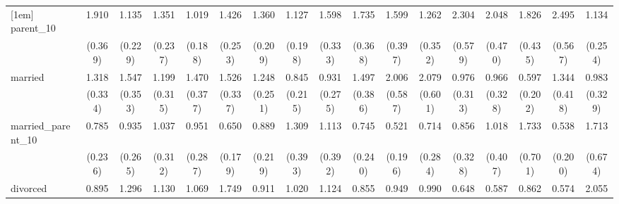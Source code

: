 {\begin{tabular}{l*{16}{c}}
[1em]
parent\_10           &       1.910\sym{***}&       1.135         &       1.351         &       1.019         &       1.426\sym{*}  &       1.360\sym{*}  &       1.127         &       1.598\sym{*}  &       1.735\sym{**} &       1.599         &       1.262         &       2.304\sym{***}&       2.048\sym{**} &       1.826\sym{*}  &       2.495\sym{***}&       1.134         \\
                    &     (0.369)         &     (0.229)         &     (0.237)         &     (0.188)         &     (0.253)         &     (0.209)         &     (0.198)         &     (0.333)         &     (0.368)         &     (0.397)         &     (0.352)         &     (0.579)         &     (0.470)         &     (0.435)         &     (0.567)         &     (0.254)         \\
[1em]
married             &       1.318         &       1.547         &       1.199         &       1.470         &       1.526         &       1.248         &       0.845         &       0.931         &       1.497         &       2.006\sym{*}  &       2.079\sym{*}  &       0.976         &       0.966         &       0.597         &       1.344         &       0.983         \\
                    &     (0.334)         &     (0.353)         &     (0.315)         &     (0.377)         &     (0.337)         &     (0.251)         &     (0.215)         &     (0.275)         &     (0.386)         &     (0.587)         &     (0.601)         &     (0.313)         &     (0.328)         &     (0.202)         &     (0.418)         &     (0.329)         \\
[1em]
married\_parent\_10   &       0.785         &       0.935         &       1.037         &       0.951         &       0.650         &       0.889         &       1.309         &       1.113         &       0.745         &       0.521         &       0.714         &       0.856         &       1.018         &       1.733         &       0.538         &       1.713         \\
                    &     (0.236)         &     (0.265)         &     (0.312)         &     (0.287)         &     (0.179)         &     (0.219)         &     (0.393)         &     (0.392)         &     (0.240)         &     (0.196)         &     (0.284)         &     (0.328)         &     (0.407)         &     (0.701)         &     (0.200)         &     (0.674)         \\
[1em]
divorced            &       0.895         &       1.296         &       1.130         &       1.069         &       1.749\sym{*}  &       0.911         &       1.020         &       1.124         &       0.855         &       0.949         &       0.990         &       0.648         &       0.587         &       0.862         &       0.574         &       2.055\sym{*}  \\

\end{tabular}}
